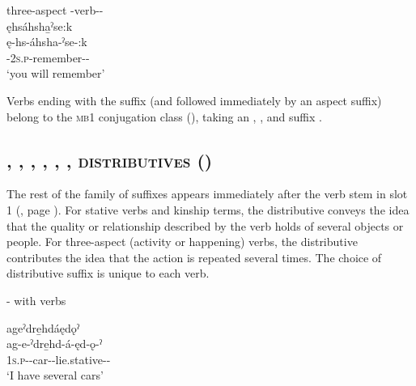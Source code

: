 \ea\label{ex:eventex3} three-aspect  {\future}-verb-\textsc{\distributive-\modalizer}\\
ęhsáhsha̱ˀse:k\\
\gll ę-hs-áhsha-ˀse-:k\\
 \fut-\textsc{2s.p}-remember-{\distributive}-{\modalizer}\\
\glt `you will remember'
\z

Verbs ending with the  {\distributive} suffix (and followed immediately by an aspect suffix) belong to the \textsc{mb1} conjugation class (), taking an  \textsc{\habitual} , \stem{-:} \textsc{\stative}, and  \textsc{\punctual} suffix . 



\subsection{, , , , , ,  \textsc{distributives} (\distributive)} \label{[-ǫ], [-nyǫ], distributives}
The rest of the family of {\distributive} suffixes appears immediately after the verb stem in slot 1 (, page \pageref{figtab:1:verbsuffixorder}). For stative verbs and kinship terms, the distributive conveys the idea that the quality or relationship described by the verb holds of several objects or people. For three-aspect (activity or happening) verbs, the distributive contributes the idea that the action is repeated several times. The choice of distributive suffix is unique to each verb.

\ea\label{ex:distrex}  {\distributive}-{\stative} with {\stative} verbs

\ea ageˀdre̱hdáędǫˀ\\
\gll ag-e-ˀdre̱hd-á-ęd-ǫ-ˀ\\
\textsc{1s.p}-{\joinerE}-car-{\joinerA}-lie.stative-{\distributive}-{\stative}\\
\glt `I have several cars'


